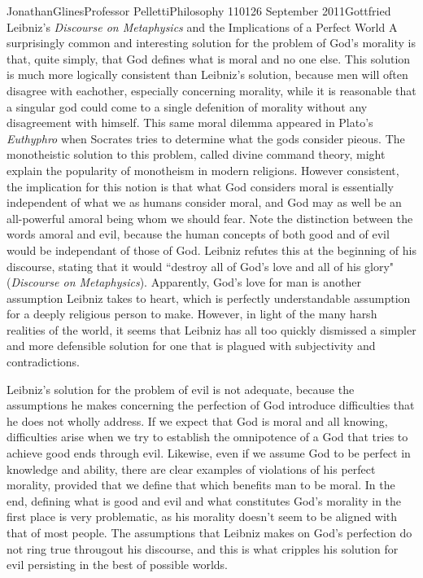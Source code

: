 \documentclass[12pt,letterpaper]{article}
\begin{document}
\begin{mla}{Jonathan}{Glines}{Professor Pelletti}{Philosophy 1101}{26 September 2011}{Gottfried Leibniz's \textit{Discourse on Metaphysics} and the Implications of a Perfect World}
A surprisingly common and interesting solution for the problem of God's morality is that, quite simply, that God defines what is moral and no one else. This solution is much more logically consistent than Leibniz's solution, because men will often disagree with eachother, especially concerning morality, while it is reasonable that a singular god could come to a single defenition of morality without any disagreement with himself. This same moral dilemma appeared in Plato's \textit{Euthyphro} when Socrates tries to determine what the gods consider pieous. The monotheistic solution to this problem, called divine command theory, might explain the popularity of monotheism in modern religions. However consistent, the implication for this notion is that what God considers moral is essentially independent of what we as humans consider moral, and God may as well be an all-powerful amoral being whom we should fear. Note the distinction between the words amoral and evil, because the human concepts of both good and of evil would be independant of those of God. Leibniz refutes this at the beginning of his discourse, stating that it would ``destroy all of God's love and all of his glory" (\textit{Discourse on Metaphysics}). Apparently, God's love for man is another assumption Leibniz takes to heart, which is perfectly understandable assumption for a deeply religious person to make. However, in light of the many harsh realities of the world, it seems that Leibniz has all too quickly dismissed a simpler and more defensible solution for one that is plagued with subjectivity and contradictions.

Leibniz's solution for the problem of evil is not adequate, because the assumptions he makes concerning the perfection of God introduce difficulties that he does not wholly address. If we expect that God is moral and all knowing, difficulties arise when we try to establish the omnipotence of a God that tries to achieve good ends through evil. Likewise, even if we assume God to be perfect in knowledge and ability, there are clear examples of violations of his perfect morality, provided that we define that which benefits man to be moral. In the end, defining what is good and evil and what constitutes God's morality in the first place is very problematic, as his morality doesn't seem to be aligned with that of most people. The assumptions that Leibniz makes on God's perfection do not ring true througout his discourse, and this is what cripples his solution for evil persisting in the best of possible worlds.


%
%
%
\end{mla}
\end{document}
